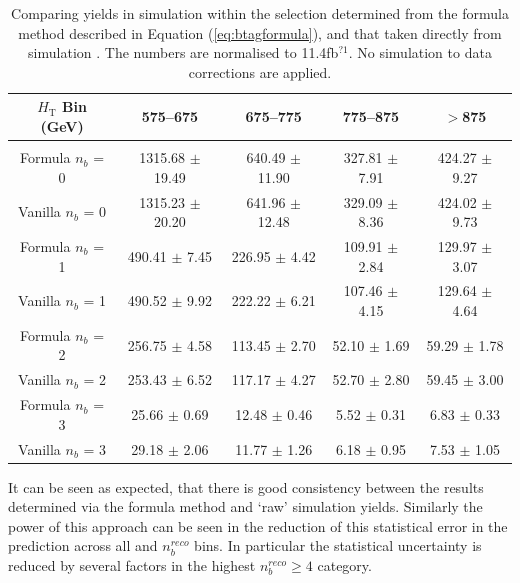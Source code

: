 \begin{table}[ht!]
\begin{center}
\begin{tabular*}{0.95\textwidth}{@{\extracolsep{\fill}}ccccc}
\\
\hline
$H_{\textrm{T}}$ Bin (GeV)         & 575--675                  & 675--775                  & 775--875                  & $>$875                   \\ 
\hline\hline
\\
Formula $n_{b}$ = 0                & 1315.68  $\pm$  19.49     & 640.49  $\pm$  11.90      & 327.81  $\pm$  7.91       & 424.27  $\pm$  9.27      \\
Vanilla $n_{b}$ = 0                & 1315.23  $\pm$  20.20     & 641.96  $\pm$  12.48      & 329.09  $\pm$  8.36       & 424.02  $\pm$  9.73      \\
\hline
Formula $n_{b}$ = 1                & 490.41  $\pm$  7.45       & 226.95  $\pm$  4.42       & 109.91  $\pm$  2.84       & 129.97  $\pm$  3.07      \\
Vanilla $n_{b}$ = 1                & 490.52  $\pm$  9.92       & 222.22  $\pm$  6.21       & 107.46  $\pm$  4.15       & 129.64  $\pm$  4.64      \\
\hline
Formula $n_{b}$ = 2                & 256.75  $\pm$  4.58       & 113.45  $\pm$  2.70       & 52.10  $\pm$  1.69        & 59.29  $\pm$  1.78       \\
Vanilla $n_{b}$ = 2                  & 253.43  $\pm$  6.52       & 117.17  $\pm$  4.27       & 52.70  $\pm$  2.80        & 59.45  $\pm$  3.00       \\
\hline
Formula $n_{b}$ = 3                  & 25.66  $\pm$  0.69        & 12.48  $\pm$  0.46        & 5.52  $\pm$  0.31         & 6.83  $\pm$  0.33        \\
Vanilla $n_{b}$ = 3                  & 29.18  $\pm$  2.06        & 11.77  $\pm$  1.26        & 6.18  $\pm$  0.95         & 7.53  $\pm$  1.05        \\ 
\end{tabular*}
\end{center}
\caption[Comparing yields in simulation within the \mupjets selection determined from the formula method described in Equation (\ref{eq:btagformula}), and that taken directly from simulation . ]{Comparing yields in simulation within the \mupjets selection determined from the formula method described in Equation (\ref{eq:btagformula}), and that taken directly from simulation . The numbers are normalised to 11.4fb$^{?1}$. No simulation to data corrections are applied.}\label{tab:sanitycheck}
\end{table}

It can be seen as expected, that there is good consistency between the results determined via the formula method and `raw' simulation yields. Similarly the power of this approach can be seen in the reduction of this statistical error in the prediction across all \theht and $n_{b}^{reco}$ bins. In particular the statistical uncertainty is reduced by several factors in the highest $n_{b}^{reco} \geq 4$ category.

